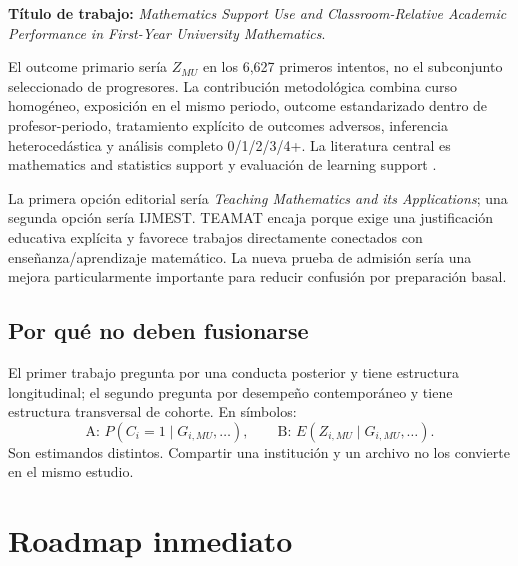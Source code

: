 \documentclass[11pt,letterpaper]{article}
\begin{document}
\textbf{Título de trabajo:} \emph{Mathematics Support Use and Classroom-Relative Academic Performance in First-Year University Mathematics}.

El outcome primario sería $Z_{MU}$ en los 6,627 primeros intentos, no el subconjunto seleccionado de progresores. La contribución metodológica combina curso homogéneo, exposición en el mismo periodo, outcome estandarizado dentro de profesor-periodo, tratamiento explícito de outcomes adversos, inferencia heterocedástica y análisis completo 0/1/2/3/4+. La literatura central es mathematics and statistics support y evaluación de learning support \citep{mullen2024,lawson2020,matthews2013,macanbhaird2009,jacob2019,pell2008,buchele2024}.

La primera opción editorial sería \emph{Teaching Mathematics and its Applications}; una segunda opción sería IJMEST. TEAMAT encaja porque exige una justificación educativa explícita y favorece trabajos directamente conectados con enseñanza/aprendizaje matemático. La nueva prueba de admisión sería una mejora particularmente importante para reducir confusión por preparación basal.

\subsection{Por qué no deben fusionarse}

El primer trabajo pregunta por una conducta posterior y tiene estructura longitudinal; el segundo pregunta por desempeño contemporáneo y tiene estructura transversal de cohorte. En símbolos:
\[
\text{A: }P(C_i=1\mid G_{i,MU},\ldots),
\qquad
\text{B: }E(Z_{i,MU}\mid G_{i,MU},\ldots).
\]
Son estimandos distintos. Compartir una institución y un archivo no los convierte en el mismo estudio.

\section{Roadmap inmediato}
\end{document}
